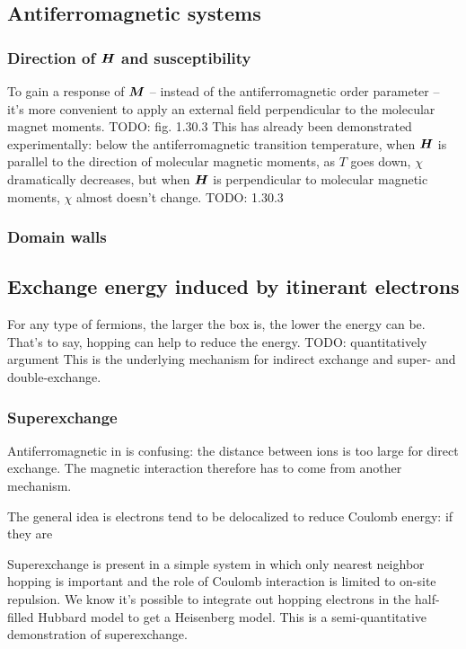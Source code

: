 \documentclass[hyperref, a4paper]{article}
\begin{document}
\subsection{Antiferromagnetic systems}

\subsubsection{Direction of $\vb*{H}$ and susceptibility}

To gain a response of $\vb*{M}$ -- instead of the antiferromagnetic order parameter -- 
it's more convenient to apply an external field 
perpendicular to the molecular magnet moments. TODO: fig. 1.30.3 
This has already been demonstrated experimentally:
below the antiferromagnetic transition temperature,
when $\vb*{H}$ is parallel to the direction of molecular magnetic moments,
as $T$ goes down, $\chi$ dramatically decreases, 
but when $\vb*{H}$ is perpendicular to molecular magnetic moments, 
$\chi$ almost doesn't change. TODO: 1.30.3 

\subsubsection{Domain walls}



\subsection{Exchange energy induced by itinerant electrons}

For any type of fermions, 
the larger the box is, 
the lower the energy can be.
That's to say, 
hopping can help to reduce the energy. TODO: quantitatively argument
This is the underlying mechanism for indirect exchange and 
super- and double-exchange.

\subsubsection{Superexchange}

Antiferromagnetic in  is confusing: 
the distance between  ions is too large for direct exchange.
The magnetic interaction therefore has to come from another mechanism.

The general idea is electrons tend to be delocalized to reduce Coulomb energy:
if they are 

Superexchange is present in a simple system 
in which only nearest neighbor hopping is important 
and the role of Coulomb interaction 
is limited to on-site repulsion.
We know it's possible to integrate out hopping electrons in the half-filled Hubbard model 
to get a Heisenberg model.
This is a semi-quantitative demonstration of superexchange.
\end{document}
